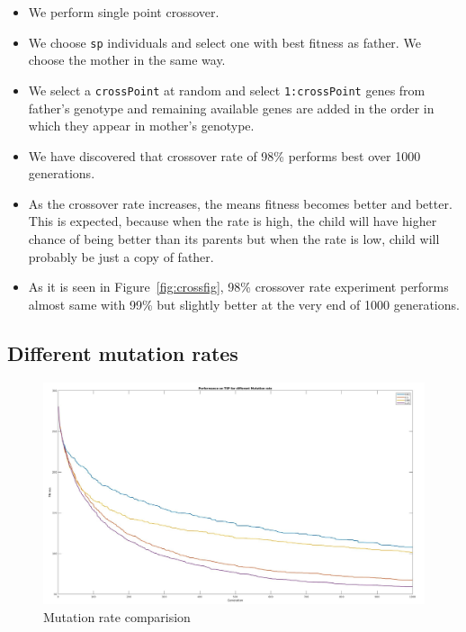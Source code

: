 \documentclass[a4paper, 12pt]{article}
\begin{document}
\begin{itemize}
    \item We perform single point crossover.
    \item We choose \texttt{sp} individuals and select one with best fitness as father. We choose the mother in the same way.
    \item We select a \texttt{crossPoint} at random and select \texttt{1:crossPoint} genes from father's genotype and remaining available genes are added in the order in which they appear in mother's genotype.
    \item We have discovered that crossover rate of 98\% performs best over 1000 generations.
    \item As the crossover rate increases, the means fitness becomes better and better. This is expected, because when the rate is high, the child will have higher chance of being better than its parents but when the rate is low, child will probably be just a copy of father.
    \item As it is seen in Figure~\ref{fig:crossfig}, 98\% crossover rate experiment performs almost same with 99\% but slightly better at the very end of 1000 generations.
\end{itemize}

\newpage

\subsection{Different mutation rates}


\begin{figure}[ht!]
  \centering
  \includegraphics[width=1.0\textwidth]{images/mutation_exp_25.jpg}
    \caption{Mutation rate comparision\label{fig:mutfig}}
\end{figure}
\end{document}
